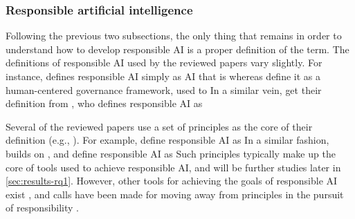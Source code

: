 \subsubsection{Responsible artificial intelligence}
\label{sec:definition-responsibleAI}
Following the previous two subsections, the only thing that remains in order to understand how to develop responsible AI is a proper definition of the term. The definitions of responsible AI used by the reviewed papers vary slightly. For instance, \textcite[p. 6]{Doorn_2021} defines responsible AI simply as AI that is  whereas \textcite[p. 4964]{WangY_2020} define it as a human-centered governance framework, used to  In a similar vein, \textcite[p. 58-59]{Papagiannidis_2022} get their definition from \textcite{Singapore_framework}, who defines responsible AI as  %

Several of the reviewed papers use a set of principles as the core of their definition (e.g., \cite{WangW_2021,Cheng_2021}). For example, \textcite[p. 83]{BarredoArrieta_2020} define responsible AI as  In a similar fashion, \textcite[p. 258]{Mikalef_2022} builds on \textcite{Accenture_AIservices}, and define responsible AI as  Such principles typically make up the core of tools used to achieve responsible AI, and will be further studies later in \autoref{sec:results-rq1}. However, other tools for achieving the goals of responsible AI exist \parencite{Werder_2022}, and calls have been made for moving away from principles in the pursuit of responsibility \parencite{Henriksen_2021}.

